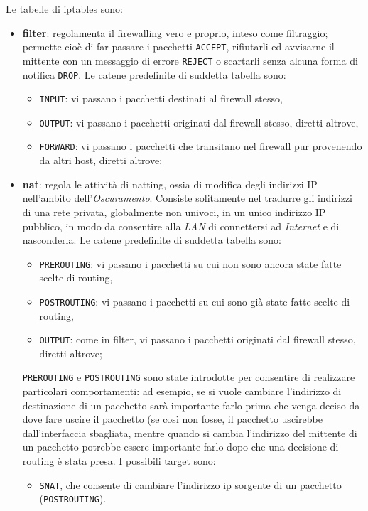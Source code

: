 \documentclass[a4paper,11pt]{article}
\def\code#1{\texttt{#1}}
\begin{document}
Le tabelle di iptables sono:
\begin{itemize}
\item \textbf{filter}: regolamenta il firewalling vero e proprio, inteso come filtraggio; permette cioè di far passare i pacchetti \code{ACCEPT}, rifiutarli ed avvisarne il mittente con un messaggio di errore \code{REJECT} o scartarli senza alcuna forma di notifica \code{DROP}.
Le catene predefinite di suddetta tabella sono:
\begin{itemize}
\item \code{INPUT}: vi passano i pacchetti destinati al firewall stesso,
\item \code{OUTPUT}: vi passano i pacchetti originati dal firewall stesso, diretti altrove,
\item \code{FORWARD}: vi passano i pacchetti che transitano nel firewall pur provenendo da altri host, diretti altrove;
\end{itemize}
\item \textbf{nat}: regola le attività di natting, ossia di modifica degli indirizzi IP nell'ambito dell'\textit{Oscuramento}. Consiste solitamente nel tradurre gli indirizzi di una rete privata, globalmente non univoci, in un unico indirizzo IP pubblico, in modo da consentire alla \textit{LAN} di connettersi ad \textit{Internet} e di nasconderla. Le catene predefinite di suddetta tabella sono: \label{NAT}
\begin{itemize}
\item \code{PREROUTING}: vi passano i pacchetti su cui non sono ancora state fatte scelte di routing,
\item \code{POSTROUTING}: vi passano i pacchetti su cui sono già state fatte scelte di routing,
\item \code{OUTPUT}: come in filter, vi passano i pacchetti originati dal firewall stesso, diretti altrove;
\end{itemize}
\code{PREROUTING} e \code{POSTROUTING} sono state introdotte per consentire di realizzare particolari comportamenti: ad esempio, se si vuole cambiare l’indirizzo di destinazione di un pacchetto sarà importante farlo prima che venga deciso da dove fare uscire il pacchetto (se così non fosse, il pacchetto uscirebbe dall’interfaccia sbagliata, mentre quando si cambia l'indirizzo del mittente di un pacchetto potrebbe essere importante farlo dopo che una decisione di routing è stata presa. I possibili target sono:
\begin{itemize}
\item \code{SNAT}, che consente di cambiare l’indirizzo ip sorgente di un pacchetto (\code{POSTROUTING}).

\end{itemize}
\end{itemize}
\end{document}

